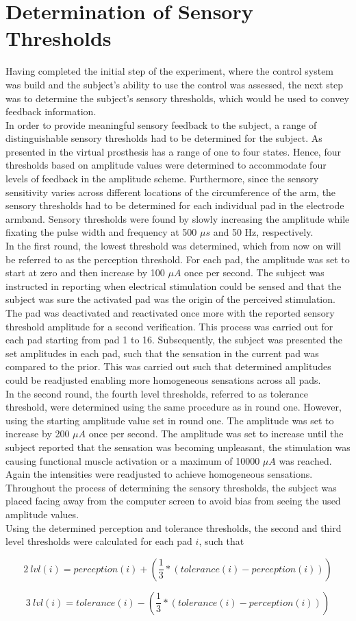 
\section{Determination of Sensory Thresholds}

Having completed the initial step of the experiment, where the control system was build and the subject's ability to use the control was assessed, the next step was to determine the subject's sensory thresholds, which would be used to convey feedback information. \\
In order to provide meaningful sensory feedback to the subject, a range of distinguishable sensory thresholds had to be determined for the subject. As presented in  the virtual prosthesis has a range of one to four states. Hence, four thresholds based on amplitude values were determined to accommodate four levels of feedback in the amplitude scheme. Furthermore, since the sensory sensitivity varies across different locations of the circumference of the arm, the sensory thresholds had to be determined for each individual pad in the electrode armband. Sensory thresholds were found by slowly increasing the amplitude while fixating the pulse width and frequency at 500 $\mu s $ and 50 Hz, respectively. \\
In the first round, the lowest threshold was determined, which from now on will be referred to as the perception threshold. For each pad, the amplitude was set to start at zero and then increase by 100 $\mu A $ once per second. The subject was instructed in reporting when electrical stimulation could be sensed and that the subject was sure the activated pad was the origin of the perceived stimulation. The pad was deactivated and reactivated once more with the reported sensory threshold amplitude for a second verification. This process was carried out for each pad starting from pad 1 to 16. Subsequently, the subject was presented the set amplitudes in each pad, such that the sensation in the current pad was compared to the prior. This was carried out such that determined amplitudes could be readjusted enabling more homogeneous sensations across all pads.  \\
In the second round, the fourth level thresholds, referred to as tolerance threshold, were determined using the same procedure as in round one. However, using the starting amplitude value set in round one. The amplitude was set to increase by 200 $\mu A $ once per second. The amplitude was set to increase until the subject reported that the sensation was becoming unpleasant, the stimulation was causing functional muscle activation or a maximum of 10000 $\mu A $ was reached. Again the intensities were readjusted to achieve homogeneous sensations. Throughout the process of determining the sensory thresholds, the subject was placed facing away from the computer screen to avoid bias from seeing the used amplitude values.  \\ 
Using the determined perception and tolerance thresholds, the second and third level thresholds were calculated for each pad $i$, such that

\begin{equation}
2~lvl(i) = perception(i) + (\frac{1}{3} * (tolerance(i) - perception(i)))
\end{equation}

\begin{equation}
3~lvl(i) = tolerance(i) - (\frac{1}{3} * (tolerance(i) - perception(i)))
\end{equation}


       